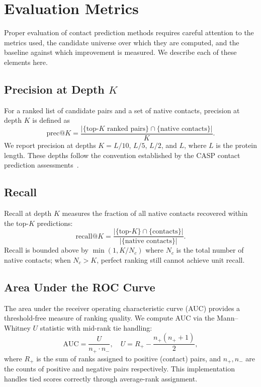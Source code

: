 \section{Evaluation Metrics}
\label{sec:methods-metrics}

Proper evaluation of contact prediction methods requires careful attention to
the metrics used, the candidate universe over which they are computed, and the
baseline against which improvement is measured.  We describe each of these
elements here.

\subsection{Precision at Depth \texorpdfstring{$K$}{K}}
For a ranked list of candidate pairs and a set of native contacts, precision
at depth $K$ is defined as
\begin{equation}
	\mathrm{prec}@K = \frac{|\{\text{top-}K \text{ ranked pairs}\} \cap
		\{\text{native contacts}\}|}{K}.
	\label{eq:precision}
\end{equation}
We report precision at depths $K = L/10$, $L/5$, $L/2$, and $L$, where $L$ is
the protein length.  These depths follow the convention established by the
CASP contact prediction assessments~\cite{ezkurdia2009}.

\subsection{Recall}
Recall at depth $K$ measures the fraction of all native contacts recovered
within the top-$K$ predictions:
\begin{equation}
	\mathrm{recall}@K =
	\frac{|\{\text{top-}K\} \cap \{\text{contacts}\}|}{|\{\text{native contacts}\}|}.
	\label{eq:recall}
\end{equation}
Recall is bounded above by $\min(1, K / N_c)$ where $N_c$ is the total number
of native contacts; when $N_c > K$, perfect ranking still cannot achieve unit
recall.

\subsection{Area Under the ROC Curve}
The area under the receiver operating characteristic curve (AUC) provides a
threshold-free measure of ranking quality.  We compute AUC via the
Mann--Whitney $U$ statistic with mid-rank tie handling:
\begin{equation}
	\mathrm{AUC} = \frac{U}{n_+ \cdot n_-}, \quad
	U = R_+ - \frac{n_+(n_+ + 1)}{2},
	\label{eq:auc}
\end{equation}
where $R_+$ is the sum of ranks assigned to positive (contact) pairs, and
$n_+, n_-$ are the counts of positive and negative pairs respectively.  This
implementation handles tied scores correctly through average-rank assignment.

